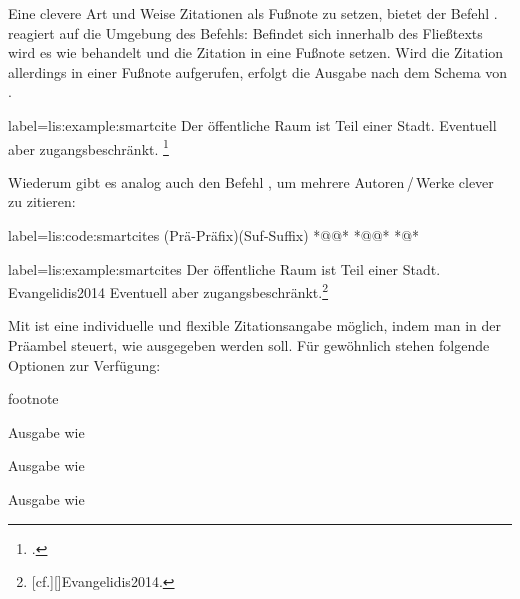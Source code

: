 Eine clevere Art und Weise Zitationen als Fußnote zu setzen,
bietet der Befehl .
  reagiert auf die Umgebung des Befehls:
 Befindet sich  innerhalb des Fließtexts wird es wie  behandelt 
 und die Zitation in eine Fußnote setzen. 
Wird die Zitation allerdings in einer Fußnote aufgerufen,
erfolgt die Ausgabe nach dem Schema von . 

\begin{lfgwexample}{label={lis:example:smartcite}}
Der öffentliche Raum ist Teil einer Stadt.\smartcite{Osland2016} 
Eventuell aber zugangsbeschränkt. \footnote{\smartcite[vgl.][] {Evangelidis2014}.}
\end{lfgwexample}

Wiederum gibt es analog auch den Befehl , 
um mehrere Autoren\,/\,Werke clever zu zitieren:
\begin{lfgwcode}{label={lis:code:smartcites}}
\smartcites(Prä-Präfix)(Suf-Suffix)%
  *@@*%
  *@@*%
  *@\ldots@*
\end{lfgwcode}
\begin{lfgwexample}{label={lis:example:smartcites}}
Der öffentliche Raum ist Teil einer Stadt. {Evangelidis2014} 
Eventuell aber zugangsbeschränkt.\footnote{ 
[cf.][]{Evangelidis2014}.}
\end{lfgwexample}

Mit   ist eine individuelle und flexible Zitationsangabe möglich,
indem man in der Präambel steuert,
wie  ausgegeben werden soll.
Für gewöhnlich stehen folgende Optionen zur Verfügung:
\begin{labeling}{footnote}
	\item[plain] Ausgabe wie 
	\item[inline]Ausgabe wie 
	\item[footnote]Ausgabe wie 
\end{labeling}

